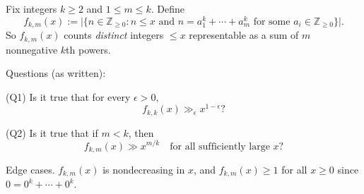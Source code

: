 Fix integers $k\ge 2$ and $1\le m\le k$.
Define
\[
f_{k,m}(x):=\bigl|\{n\in\mathbb Z_{\ge 0}: n\le x\text{ and }n=a_1^k+\cdots+a_m^k\text{ for some }a_i\in\mathbb Z_{\ge 0}\}\bigr|.
\]
So $f_{k,m}(x)$ counts \emph{distinct} integers $\le x$ representable as a sum of $m$ nonnegative $k$th powers.

Questions (as written):

(Q1) Is it true that for every $\epsilon>0$,
\[
f_{k,k}(x)\gg_\epsilon x^{1-\epsilon}?\]

(Q2) Is it true that if $m<k$, then
\[
f_{k,m}(x)\gg x^{m/k}\quad\text{for all sufficiently large }x?\]

Edge cases.
$f_{k,m}(x)$ is nondecreasing in $x$, and $f_{k,m}(x)\ge 1$ for all $x\ge 0$ since $0=0^k+\cdots+0^k$.
